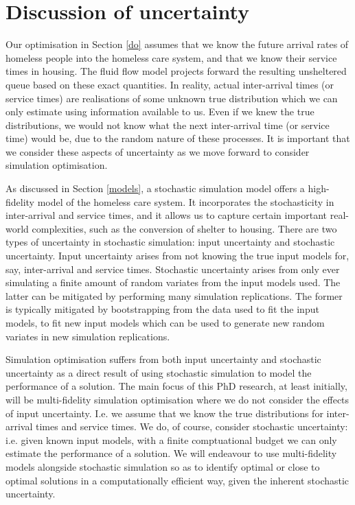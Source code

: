 \documentclass[12pt,a4paper]{article}
\begin{document}
\newpage

\section{Discussion of uncertainty} \label{uncert}

Our optimisation in Section \ref{do} assumes that we know the future arrival rates of homeless people into the homeless care system, and that we know their service times in housing. The fluid flow model projects forward the resulting unsheltered queue based on these exact quantities. In reality, actual inter-arrival times (or service times) are realisations of some unknown true distribution which we can only estimate using information available to us. Even if we knew the true distributions, we would not know what the next inter-arrival time (or service time) would be, due to the random nature of these processes. It is important that we consider these aspects of uncertainty as we move forward to consider simulation optimisation.

As discussed in Section \ref{models}, a stochastic simulation model offers a high-fidelity model of the homeless care system. It incorporates the stochasticity in inter-arrival and service times, and it allows us to capture certain important real-world complexities, such as the conversion of shelter to housing. There are two types of uncertainty in stochastic simulation: input uncertainty and stochastic uncertainty. Input uncertainty arises from not knowing the true input models for, say, inter-arrival and service times. Stochastic uncertainty arises from only ever simulating a finite amount of random variates from the input models used. The latter can be mitigated by performing many simulation replications. The former is typically mitigated by bootstrapping from the data used to fit the input models, to fit new input models which can be used to generate new random variates in new simulation replications.

Simulation optimisation suffers from both input uncertainty and stochastic uncertainty as a direct result of using stochastic simulation to model the performance of a solution. The main focus of this PhD research, at least initially, will be multi-fidelity simulation optimisation where we do not consider the effects of input uncertainty. I.e. we assume that we know the true distributions for inter-arrival times and service times. We do, of course, consider stochastic uncertainty: i.e. given known input models, with a finite comptuational budget we can only estimate the performance of a solution. We will endeavour to use multi-fidelity models alongside stochastic simulation so as to identify optimal or close to optimal solutions in a computationally efficient way, given the inherent stochastic uncertainty.
\end{document}
